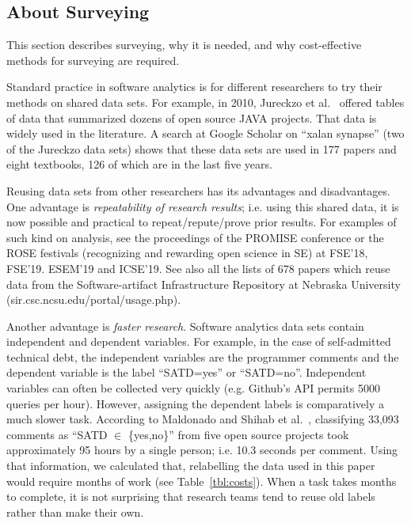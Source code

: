 \documentclass[10pt,conference]{IEEEtran}
\begin{document}

\subsection{About Surveying}
This section describes surveying, why
it is needed, and why cost-effective methods for surveying are required.

Standard practice in software analytics is for different researchers to try their methods on shared data sets.
For example, in 2010, Jureckzo et al.~\cite{Jureczko:2010} offered tables  of data that summarized dozens of open source JAVA projects.
That data is widely used in the literature. A search at Google Scholar on ``xalan  synapse'' (two of the Jureckzo data sets)
shows that these data sets are used in 177 papers and eight textbooks, 126 of which are in the last five years.

Reusing data sets from other researchers  has its advantages and disadvantages.
 One advantage is {\em repeatability of research results}; i.e. using this shared data, it is now possible and practical
to  repeat/repute/prove prior results. For examples of such kind on analysis, see the proceedings of the PROMISE conference
or the ROSE festivals (recognizing and rewarding open science in SE) at FSE'18, FSE'19. ESEM'19 and ICSE'19.  
See also all the lists of 678 papers which reuse data from the Software-artifact Infrastructure Repository  at Nebraska University (sir.csc.ncsu.edu/portal/usage.php).

 
Another advantage is {\em faster research}.
Software analytics data sets contain independent and dependent variables. For example,
in the case of self-admitted technical debt, the independent variables are the programmer comments and the dependent variable
is the label ``SATD=yes'' or ``SATD=no''.
Independent variables can often be collected very quickly
(e.g.  Github's API permits  5000 queries per hour).
However,
assigning the dependent labels is comparatively a much  slower task.
According to Maldonado and Shihab et al.~\cite{maldonado2015detecting}, classifying 33,093 comments as ``SATD $\in$ \{yes,no\}''
from five open source projects  took approximately 95 hours by a single person; i.e.  10.3 seconds per comment.
Using that information, we calculated that, relabelling the data used in this paper would require
months of work (see Table~\ref{tbl:costs}).
When a task takes months to complete,
it is not surprising that research teams tend to reuse old labels rather
than make their own.  
\end{document}
